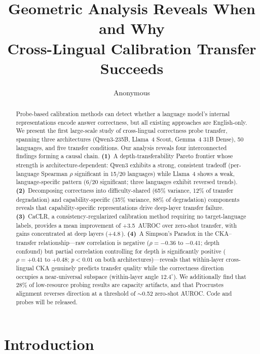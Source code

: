 \documentclass[11pt,a4paper]{article}
\title{Geometric Analysis Reveals When and Why\\Cross-Lingual Calibration Transfer Succeeds}
\author{Anonymous}
\date{}
\newcommand{\pp}{\,\text{pp}}
\begin{document}
\maketitle

\begin{abstract}
Probe-based calibration methods can detect whether a language model's internal representations encode answer correctness, but all existing approaches are English-only. We present the first large-scale study of cross-lingual correctness probe transfer, spanning three architectures (Qwen3-235B, Llama~4 Scout, Gemma~4 31B Dense), 50 languages, and five transfer conditions. Our analysis reveals four interconnected findings forming a causal chain. \textbf{(1)}~A depth-transferability Pareto frontier whose strength is architecture-dependent: Qwen3 exhibits a strong, consistent tradeoff (per-language Spearman $\rho$ significant in 15/20 languages) while Llama~4 shows a weak, language-specific pattern (6/20 significant; three languages exhibit reversed trends). \textbf{(2)}~Decomposing correctness into difficulty-shared (65\% variance, 12\% of transfer degradation) and capability-specific (35\% variance, 88\% of degradation) components reveals that capability-specific representations drive deep-layer transfer failure. \textbf{(3)}~CaCLR, a consistency-regularized calibration method requiring no target-language labels, provides a mean improvement of +3.5\pp{} AUROC over zero-shot transfer, with gains concentrated at deep layers (+4.8\pp). \textbf{(4)}~A Simpson's Paradox in the CKA--transfer relationship---raw correlation is negative ($\rho = -0.36$ to $-0.41$; depth confound) but partial correlation controlling for depth is significantly positive ($\rho = +0.41$ to $+0.48$; $p < 0.01$ on both architectures)---reveals that within-layer cross-lingual CKA genuinely predicts transfer quality while the correctness direction occupies a near-universal subspace (within-layer angle $12.4^{\circ}$). We additionally find that 28\% of low-resource probing results are capacity artifacts, and that Procrustes alignment reverses direction at a threshold of $\sim$0.52 zero-shot AUROC. Code and probes will be released.
\end{abstract}

\section{Introduction}
\label{sec:intro}
\end{document}
